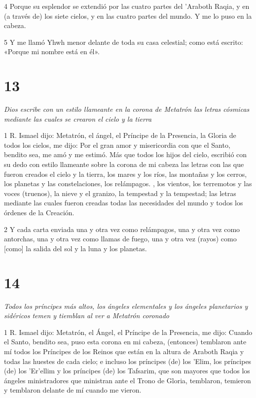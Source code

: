 \par 4 Porque su esplendor se extendió por las cuatro partes del 'Araboth Raqia, y en (a través de) los siete cielos, y en las cuatro partes del mundo. Y me lo puso en la cabeza.

\par 5 Y me llamó Yhwh menor delante de toda su casa celestial; como está escrito: «Porque mi nombre está en él».

\chapter{13}

\par \textit{Dios escribe con un estilo llameante en la corona de Metatrón las letras cósmicas mediante las cuales se crearon el cielo y la tierra}

\par 1 R. Ismael dijo: Metatrón, el ángel, el Príncipe de la Presencia, la Gloria de todos los cielos, me dijo: Por el gran amor y misericordia con que el Santo, bendito sea, me amó y me estimó. Más que todos los hijos del cielo, escribió con su dedo con estilo llameante sobre la corona de mi cabeza las letras con las que fueron creados el cielo y la tierra, los mares y los ríos, las montañas y los cerros, los planetas y las constelaciones, los relámpagos. , los vientos, los terremotos y las voces (truenos), la nieve y el granizo, la tempestad y la tempestad; las letras mediante las cuales fueron creadas todas las necesidades del mundo y todos los órdenes de la Creación.

\par 2 Y cada carta enviada una y otra vez como relámpagos, una y otra vez como antorchas, una y otra vez como llamas de fuego, una y otra vez (rayos) como [como] la salida del sol y la luna y los planetas.

\chapter{14}

\par \textit{Todos los príncipes más altos, los ángeles elementales y los ángeles planetarios y sidéricos temen y tiemblan al ver a Metatrón coronado}

\par 1 R. Ismael dijo: Metatrón, el Ángel, el Príncipe de la Presencia, me dijo: Cuando el Santo, bendito sea, puso esta corona en mi cabeza, (entonces) temblaron ante mí todos los Príncipes de los Reinos que están en la altura de Araboth Raqia y todas las huestes de cada cielo; e incluso los príncipes (de) los 'Elim, los príncipes (de) los 'Er'ellim y los príncipes (de) los Tafsarim, que son mayores que todos los ángeles ministradores que ministran ante el Trono de Gloria, temblaron, temieron y temblaron delante de mí cuando me vieron.

